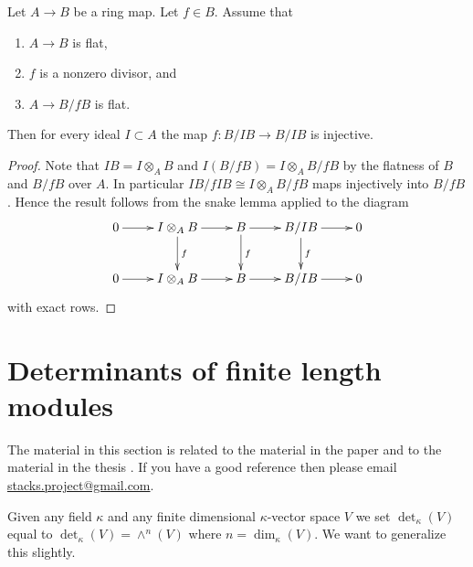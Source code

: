\begin{lemma}
\label{lemma-relative-effective-cartier-algebra}
Let $A \to B$ be a ring map. Let $f \in B$. Assume that
\begin{enumerate}
\item $A \to B$ is flat,
\item $f$ is a nonzero divisor, and
\item $A \to B/fB$ is flat.
\end{enumerate}
Then for every ideal $I \subset A$ the map
$f : B/IB \to B/IB$ is injective.
\end{lemma}

\begin{proof}
Note that $IB = I \otimes_A B$ and $I(B/fB) = I\otimes_A B/fB$
by the flatness of $B$ and $B/fB$ over $A$.
In particular $IB/fIB \cong I \otimes_A B/fB$ maps injectively
into $B/fB$. Hence the result follows from the snake lemma applied
to the diagram
$$
\xymatrix{
0 \ar[r] &
I \otimes_A B \ar[r] \ar[d]^f &
B \ar[r] \ar[d]^f &
B/IB \ar[r] \ar[d]^f &
0 \\
0 \ar[r] &
I \otimes_A B \ar[r] &
B \ar[r] &
B/IB \ar[r] &
0
}
$$
with exact rows.
\end{proof}




\section{Determinants of finite length modules}
\label{section-determinants-finite-length}

\noindent
The material in this section is related to the material in
the paper \cite{determinant} and to the material in the
thesis \cite{Joe}. If you have a good reference then please
email \href{mailto:stacks.project@gmail.com}{stacks.project@gmail.com}.

\medskip\noindent
Given any field $\kappa$ and
any finite dimensional $\kappa$-vector space $V$ we set
$\det\nolimits_\kappa(V)$ equal to $\det\nolimits_\kappa(V) = \wedge^n(V)$
where $n = \dim_\kappa(V)$. We want to generalize this slightly.

